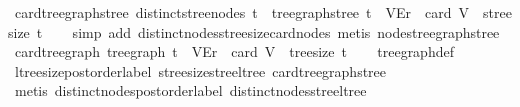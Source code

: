 \begin{isabellebody}
\endisatagproof
{\isafoldproof}%
%
\isadelimproof
\isanewline
%
\endisadelimproof
\isanewline
{}\isamarkupfalse%
\ card{\isacharunderscore}{\kern0pt}tree{\isacharunderscore}{\kern0pt}graph{\isacharunderscore}{\kern0pt}stree{\isacharcolon}{\kern0pt}\ {\isachardoublequoteopen}distinct{\isacharunderscore}{\kern0pt}stree{\isacharunderscore}{\kern0pt}nodes\ t\ {\isasymLongrightarrow}\ tree{\isacharunderscore}{\kern0pt}graph{\isacharunderscore}{\kern0pt}stree\ t\ {\isacharequal}{\kern0pt}\ {\isacharparenleft}{\kern0pt}V{\isacharcomma}{\kern0pt}E{\isacharcomma}{\kern0pt}r{\isacharparenright}{\kern0pt}\ {\isasymLongrightarrow}\ card\ V\ {\isacharequal}{\kern0pt}\ stree{\isacharunderscore}{\kern0pt}size\ t{\isachardoublequoteclose}\isanewline
%
\isadelimproof
\ \ %
\endisadelimproof
%
\isatagproof
{}\isamarkupfalse%
\ {\isacharparenleft}{\kern0pt}simp\ add{\isacharcolon}{\kern0pt}\ distinct{\isacharunderscore}{\kern0pt}nodes{\isacharunderscore}{\kern0pt}stree{\isacharunderscore}{\kern0pt}size{\isacharunderscore}{\kern0pt}card{\isacharunderscore}{\kern0pt}nodes{\isacharparenright}{\kern0pt}\ {\isacharparenleft}{\kern0pt}metis\ nodes{\isacharunderscore}{\kern0pt}tree{\isacharunderscore}{\kern0pt}graph{\isacharunderscore}{\kern0pt}stree{\isacharparenright}{\kern0pt}%
\endisatagproof
{\isafoldproof}%
%
\isadelimproof
\isanewline
%
\endisadelimproof
\isanewline
{}\isamarkupfalse%
\ card{\isacharunderscore}{\kern0pt}tree{\isacharunderscore}{\kern0pt}graph{\isacharcolon}{\kern0pt}\ {\isachardoublequoteopen}tree{\isacharunderscore}{\kern0pt}graph\ t\ {\isacharequal}{\kern0pt}\ {\isacharparenleft}{\kern0pt}V{\isacharcomma}{\kern0pt}E{\isacharcomma}{\kern0pt}r{\isacharparenright}{\kern0pt}\ {\isasymLongrightarrow}\ card\ V\ {\isacharequal}{\kern0pt}\ tree{\isacharunderscore}{\kern0pt}size\ t{\isachardoublequoteclose}\isanewline
%
\isadelimproof
\ \ %
\endisadelimproof
%
\isatagproof
{}\isamarkupfalse%
\ tree{\isacharunderscore}{\kern0pt}graph{\isacharunderscore}{\kern0pt}def\ \isamarkupfalse%
\ ltree{\isacharunderscore}{\kern0pt}size{\isacharunderscore}{\kern0pt}postorder{\isacharunderscore}{\kern0pt}label\ stree{\isacharunderscore}{\kern0pt}size{\isacharunderscore}{\kern0pt}stree{\isacharunderscore}{\kern0pt}ltree\ card{\isacharunderscore}{\kern0pt}tree{\isacharunderscore}{\kern0pt}graph{\isacharunderscore}{\kern0pt}stree\isanewline
\ \ \isamarkupfalse%
\ {\isacharparenleft}{\kern0pt}metis\ distinct{\isacharunderscore}{\kern0pt}nodes{\isacharunderscore}{\kern0pt}postorder{\isacharunderscore}{\kern0pt}label\ distinct{\isacharunderscore}{\kern0pt}nodes{\isacharunderscore}{\kern0pt}stree{\isacharunderscore}{\kern0pt}ltree{\isacharparenright}{\kern0pt}%

\end{isabellebody}
